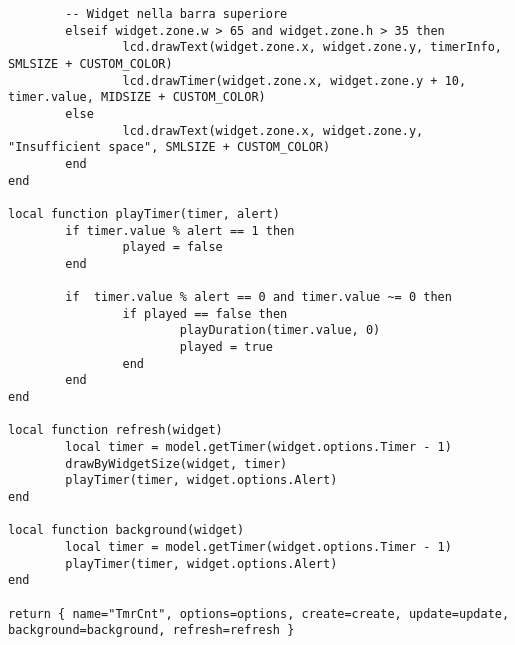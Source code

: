 \begin{lstlisting}
        -- Widget nella barra superiore
        elseif widget.zone.w > 65 and widget.zone.h > 35 then
                lcd.drawText(widget.zone.x, widget.zone.y, timerInfo, SMLSIZE + CUSTOM_COLOR)
                lcd.drawTimer(widget.zone.x, widget.zone.y + 10, timer.value, MIDSIZE + CUSTOM_COLOR)
        else
                lcd.drawText(widget.zone.x, widget.zone.y, "Insufficient space", SMLSIZE + CUSTOM_COLOR)
        end
end
        
local function playTimer(timer, alert)
        if timer.value % alert == 1 then
                played = false
        end

        if  timer.value % alert == 0 and timer.value ~= 0 then
                if played == false then
                        playDuration(timer.value, 0)
                        played = true
                end
        end
end 

local function refresh(widget)
        local timer = model.getTimer(widget.options.Timer - 1)
        drawByWidgetSize(widget, timer)
        playTimer(timer, widget.options.Alert)
end

local function background(widget)
        local timer = model.getTimer(widget.options.Timer - 1)
        playTimer(timer, widget.options.Alert)
end

return { name="TmrCnt", options=options, create=create, update=update, background=background, refresh=refresh }
\end{lstlisting}

\clearpage

